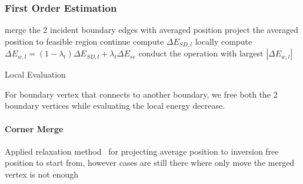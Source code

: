 \subsubsection{First Order Estimation}

\begin{algorithm}[h]
\SetAlgoLined
{}
{
  {
    merge the 2 incident boundary edges with averaged position\;
    {
      project the averaged position to feasible region\;
      {
        continue\;
      }
    }
    compute $\Delta E_{SD,l}$ locally\;
    compute $\Delta E_{w,l} = (1-\lambda_t)\Delta E_{SD,l}+\lambda_t \Delta E_{se}$
  }
}
conduct the operation with largest $|\Delta E_{w,l}|$
\caption{Local Evaluation}
\end{algorithm}
For boundary vertex that connects to another boundary, we free both the 2 boundary vertices while evaluating the local energy decrease.

\paragraph{Corner Merge} Applied relaxation method~\cite{Agmon1954Relaxation} for projecting average position to inversion free position to start from, however cases are still there where only move the merged vertex is not enough